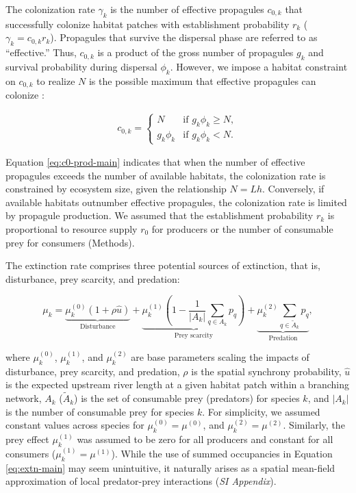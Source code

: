 \documentclass[11pt, class=article, crop=false]{standalone}
\begin{document}
The colonization rate $\gamma_k$ is the number of effective propagules $c_{0,k}$ that successfully colonize habitat patches with establishment probability $r_k$ ($\gamma_k = c_{0,k} r_k$).
Propagules that survive the dispersal phase are referred to as ``effective.'' Thus, $c_{0,k}$ is a product of the gross number of propagules $g_k$ and survival probability during dispersal $\phi_k$.
However, we impose a habitat constraint on $c_{0,k}$ to realize $N$ is the possible maximum that effective propagules can colonize \citep{takimoto_effects_2012, terui_spatial_2019}:

\begin{align}
    c_{0, k} = 
    \begin{cases}
        N & \text{if $g_k \phi_k \ge N$},\\
        g_k \phi_k & \text{if $g_k \phi_k < N$}.
    \end{cases}
    \label{eq:c0-prod-main}
\end{align}

Equation \ref{eq:c0-prod-main} indicates that when the number of effective propagules exceeds the number of available habitats, the colonization rate is constrained by ecosystem size, given the relationship $N=Lh$. Conversely, if available habitats outnumber effective propagules, the colonization rate is limited by propagule production.
We assumed that the establishment probability $r_k$ is proportional to resource supply $r_0$ for producers or the number of consumable prey for consumers (Methods).

The extinction rate comprises three potential sources of extinction, that is, disturbance, prey scarcity, and predation:

\begin{equation}
    \mu_{k} = 
        \underbrace{\mu_{k}^{(0)} (1 + \rho \hat{u})}_{\text{Disturbance}} + 
        \underbrace{\mu_{k}^{(1)} \left(1 - \frac{1}{|A_{k}|}\sum_{q\in A_{k}} p_{q} \right)}_{\text{Prey scarcity}} + 
        \underbrace{\mu_{k}^{(2)} \sum_{q \in \tilde{A}_{k}} p_{q}}_{\text{Predation}},
    \label{eq:extn-main}    
\end{equation}

where $\mu_k^{(0)}$, $\mu_k^{(1)}$, and $\mu_k^{(2)}$ are base parameters scaling the impacts of disturbance, prey scarcity, and predation, $\rho$ is the spatial synchrony probability, $\hat{u}$ is the expected upstream river length at a given habitat patch within a branching network, $A_{k}$ ($\tilde{A}_{k}$) is the set of consumable prey (predators) for species $k$, and $|A_{k}|$ is the number of consumable prey for species $k$.
For simplicity, we assumed constant values across species for $\mu_k^{(0)} = \mu^{(0)}$, and $\mu_k^{(2)} = \mu^{(2)}$.
Similarly, the prey effect $\mu_k^{(1)}$ was assumed to be zero for all producers and constant for all consumers ($\mu_k^{(1)} = \mu^{(1)}$).
While the use of summed occupancies in Equation \ref{eq:extn-main} may seem unintuitive, it naturally arises as a spatial mean-field approximation of local predator-prey interactions (\textit{SI Appendix}).
\end{document}
